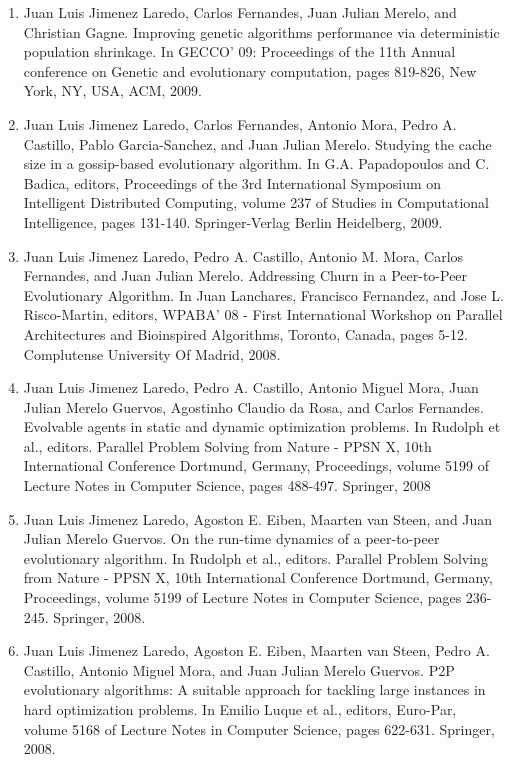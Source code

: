 \begin{description}
\begin{enumerate}
\item Juan Luis Jimenez Laredo, Carlos Fernandes, Juan Julian Merelo, and Christian Gagne. Improving genetic algorithms performance via deterministic population shrinkage. In GECCO' 09: Proceedings of the 11th Annual
     conference on Genetic and evolutionary computation, pages 819-826, New York, NY, USA, ACM, 2009.

\item Juan Luis Jimenez Laredo, Carlos Fernandes, Antonio Mora, Pedro A. Castillo, Pablo Garcia-Sanchez, and Juan Julian Merelo. Studying the cache size in a gossip-based evolutionary algorithm. In G.A. Papadopoulos
     and C. Badica, editors, Proceedings of the 3rd International Symposium on Intelligent Distributed Computing, volume 237 of Studies in Computational Intelligence, pages 131-140. Springer-Verlag Berlin Heidelberg,
     2009.

\item Juan Luis Jimenez Laredo, Pedro A. Castillo, Antonio M. Mora, Carlos Fernandes, and Juan Julian Merelo. Addressing Churn in a Peer-to-Peer Evolutionary Algorithm. In Juan Lanchares, Francisco Fernandez, and Jose L. Risco-Martin, editors, WPABA'  08 - First International Workshop on Parallel Architectures and Bioinspired Algorithms, Toronto, Canada, pages 5-12. Complutense University Of Madrid, 2008.



     
\item Juan Luis Jimenez Laredo, Pedro A. Castillo, Antonio Miguel Mora,
     Juan Julian Merelo Guervos, Agostinho Claudio da Rosa, and Carlos
     Fernandes. Evolvable agents in static and dynamic optimization problems. In Rudolph et al., editors. Parallel Problem Solving from Nature - PPSN X,
     10th International Conference Dortmund, Germany, Proceedings, volume 5199 of Lecture Notes in Computer Science, pages 488-497. Springer, 2008

\item Juan Luis Jimenez Laredo, Agoston E. Eiben, Maarten van Steen, and
     Juan Julian Merelo Guervos. On the run-time dynamics of a peer-to-peer
     evolutionary algorithm. In Rudolph et al., editors. Parallel Problem Solving from Nature - PPSN X,
     10th International Conference Dortmund, Germany, Proceedings, volume 5199 of Lecture Notes in Computer Science, pages 236-245. Springer, 2008.


\item Juan Luis Jimenez Laredo, Agoston E. Eiben, Maarten van Steen, Pedro A.
     Castillo, Antonio Miguel Mora, and Juan Julian Merelo Guervos. P2P
     evolutionary algorithms: A suitable approach for tackling large instances
     in hard optimization problems. In Emilio Luque et al., editors, Euro-Par, volume 5168 of Lecture Notes in
     Computer Science, pages 622-631. Springer, 2008.


\end{enumerate}
\end{description}
